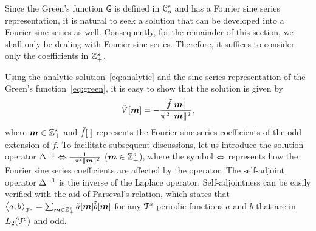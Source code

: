 Since the Green's function $\mathsf{G}$ is defined in $\mathcal{C}_o^s$ and has a
Fourier sine series representation, it is natural to seek a solution
that can be developed into a Fourier sine series as
well. Consequently, for the remainder of this section, we shall only
be dealing with Fourier sine series. Therefore, it suffices to
consider only the coefficients in $\mathbb{Z}^s_+$.

Using the analytic solution~\eqref{eq:analytic} and the sine series
representation of the Green's function~\eqref{eq:green}, it is easy to show that
the solution is given by
\begin{equation}
  \st{V}[\vect{m}] = -
  \frac{\st{f}[\vect{m}]}{\pi^2 \norm{\vect{m}}^2},
\label{eq:fourierSolution}
\end{equation}
where $\boldsymbol{m} \in \mathbb{Z}^s_+$ and $\tilde{f}[\cdot]$ represents the Fourier
sine series coefficients of the odd extension of $f$. To facilitate subsequent
discussions, let us introduce the solution operator
$\mathop{\Delta^{-1}} \Leftrightarrow \frac{1}{-\pi^2 \lVert\boldsymbol{m}\rVert^2}$  ($\boldsymbol{m} \in
\mathbb{Z}^s_+$), where the symbol $\Leftrightarrow$ represents how the Fourier sine
series coefficients are affected by the operator.
The self-adjoint operator $\mathop{\Delta^{-1}}$ is the inverse of the Laplace
operator. Self-adjointness can be easily verified with
the aid of Parseval's relation, which states that
$
  \bigl \langle a , b \bigr \rangle_{\mathcal{T}^s} = \sum_{\boldsymbol{m} \in \mathbb{Z}^s_+} \tilde{a}[\boldsymbol{m}]
  \tilde{b}[\boldsymbol{m}] 
$
for any $\mathcal{T}^s$-periodic functions $a$ and $b$ that are in
$L_2(\mathcal{T}^s)$ and odd.



